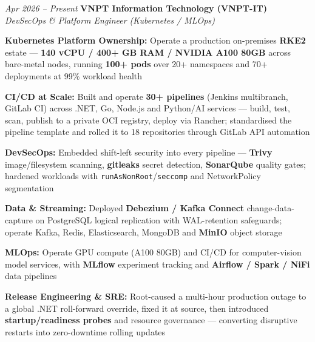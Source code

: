\begin{twocolentry}{\textit{Apr 2026 -- Present}}
    \textbf{VNPT Information Technology (VNPT-IT)} \\[4pt]
    \textit{DevSecOps \& Platform Engineer (Kubernetes / MLOps)}
\end{twocolentry}
\begin{onecolentry}
    \begin{highlights}
        \item \textbf{Kubernetes Platform Ownership:} Operate a production on-premises \textbf{RKE2} estate --- \textbf{140 vCPU / 400+ GB RAM / NVIDIA A100 80GB} across bare-metal nodes, running \textbf{100+ pods} over 20+ namespaces and 70+ deployments at 99\% workload health
        \item \textbf{CI/CD at Scale:} Built and operate \textbf{30+ pipelines} (Jenkins multibranch, GitLab CI) across .NET, Go, Node.js and Python/AI services --- build, test, scan, publish to a private OCI registry, deploy via Rancher; standardised the pipeline template and rolled it to 18 repositories through GitLab API automation
        \item \textbf{DevSecOps:} Embedded shift-left security into every pipeline --- \textbf{Trivy} image/filesystem scanning, \textbf{gitleaks} secret detection, \textbf{SonarQube} quality gates; hardened workloads with \texttt{runAsNonRoot}/\texttt{seccomp} and NetworkPolicy segmentation
        \item \textbf{Data \& Streaming:} Deployed \textbf{Debezium / Kafka Connect} change-data-capture on PostgreSQL logical replication with WAL-retention safeguards; operate Kafka, Redis, Elasticsearch, MongoDB and \textbf{MinIO} object storage
        \item \textbf{MLOps:} Operate GPU compute (A100 80GB) and CI/CD for computer-vision model services, with \textbf{MLflow} experiment tracking and \textbf{Airflow / Spark / NiFi} data pipelines
        \item \textbf{Release Engineering \& SRE:} Root-caused a multi-hour production outage to a global .NET roll-forward override, fixed it at source, then introduced \textbf{startup/readiness probes} and resource governance --- converting disruptive restarts into zero-downtime rolling updates
    \end{highlights}
\end{onecolentry}
\vspace{0.2 cm}

